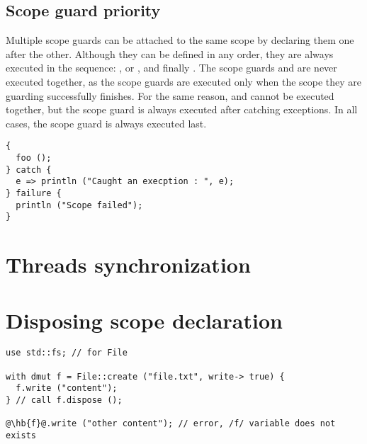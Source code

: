 \subsection{Scope guard priority}

Multiple scope guards can be attached to the same scope by declaring them one
after the other. Although they can be defined in any order, they are always
executed in the sequence: ,  or , and
finally . The scope guards  and  are
never executed together, as the  scope guards are executed only
when the scope they are guarding successfully finishes. For the same reason,
 and  cannot be executed together, but the
 scope guard is always executed after catching exceptions. In all
cases, the  scope guard is always executed last.

\begin{lstlisting}[style=coloredverbatim]
{
  foo ();
} catch {
  e => println ("Caught an execption : ", e);
} failure {
  println ("Scope failed");
}
\end{lstlisting}


\section{Threads synchronization}

\section{Disposing scope declaration}%
\label{sec:dispose_block}

\begin{lstlisting}[style=coloredverbatim, escapechar=@]
use std::fs; // for File

with dmut f = File::create ("file.txt", write-> true) {
  f.write ("content");
} // call f.dispose ();

@\hb{f}@.write ("other content"); // error, /f/ variable does not exists
\end{lstlisting}
